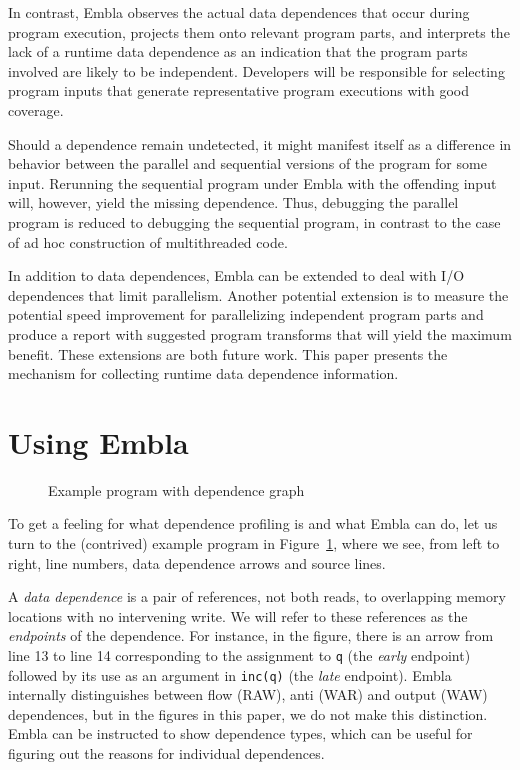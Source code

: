\documentclass{acm_proc_article-sp}
\begin{document}
In contrast, Embla
observes the actual data dependences that occur during program
execution, projects them onto relevant program parts, and interprets the
lack of a runtime data dependence as an indication that the program
parts involved are likely to be independent.
Developers will be responsible for selecting
program inputs that generate representative program executions with
good coverage.

Should a dependence remain undetected, it might manifest itself as a 
difference in behavior between the parallel and sequential versions of the
program for some input. Rerunning the sequential program under
Embla with the offending input will, however, yield the missing dependence.
Thus, debugging the parallel program is reduced to debugging the sequential 
program, in contrast to the case of ad hoc construction of multithreaded
code.

In addition to data dependences, Embla can be extended to
deal with I/O dependences that limit parallelism.  Another potential
extension is to measure the potential speed
improvement for parallelizing independent program parts and produce a
report with suggested program transforms that will yield the maximum
benefit.  These extensions are both future work.  This paper
presents the mechanism for collecting runtime data dependence information.



\section{Using Embla}

\begin{figure} 
\small

\caption{Example program with dependence graph} \label{ffirstex}
\end{figure}

To get a feeling for what dependence profiling is and what Embla can do, 
let us turn to the (contrived) example program in Figure~\ref{ffirstex},
where we see, from left to right, line numbers, data dependence 
arrows and source lines. 

A {\em data dependence} is a pair
of references, not both reads, to overlapping memory
locations with no intervening write. We will refer to these
references as the {\em endpoints} of the dependence.
For instance, in the figure, 
there is an arrow from line 13 to line 14 corresponding to
the assignment to {\tt q} (the {\em early} endpoint) followed by its use 
as an argument in {\tt inc(q)} (the {\em late} endpoint). Embla
internally distinguishes between flow (RAW), anti (WAR) and output (WAW) 
dependences, but in the figures in this paper, we do not make this
distinction. Embla can be instructed to show dependence types, which can be
useful for figuring out the reasons for individual dependences.
\end{document}
